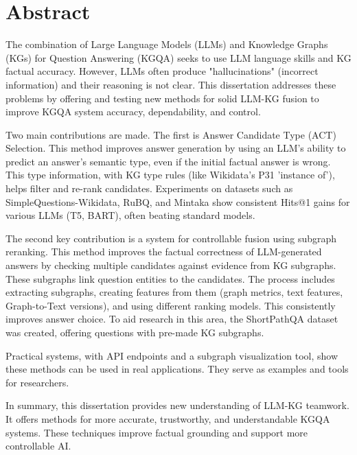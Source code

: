 \chapter*{Abstract}
The combination of Large Language Models (LLMs) and Knowledge Graphs (KGs) for Question Answering (KGQA) seeks to use LLM language skills and KG factual accuracy. However, LLMs often produce "hallucinations" (incorrect information) and their reasoning is not clear. This dissertation addresses these problems by offering and testing new methods for solid LLM-KG fusion to improve KGQA system accuracy, dependability, and control.

Two main contributions are made. The first is Answer Candidate Type (ACT) Selection. This method improves answer generation by using an LLM's ability to predict an answer's semantic type, even if the initial factual answer is wrong. This type information, with KG type rules (like Wikidata's P31 'instance of'), helps filter and re-rank candidates. Experiments on datasets such as SimpleQuestions-Wikidata, RuBQ, and Mintaka show consistent Hits@1 gains for various LLMs (T5, BART), often beating standard models.

The second key contribution is a system for controllable fusion using subgraph reranking. This method improves the factual correctness of LLM-generated answers by checking multiple candidates against evidence from KG subgraphs. These subgraphs link question entities to the candidates. The process includes extracting subgraphs, creating features from them (graph metrics, text features, Graph-to-Text versions), and using different ranking models. This consistently improves answer choice. To aid research in this area, the ShortPathQA dataset was created, offering questions with pre-made KG subgraphs.

Practical systems, with API endpoints and a subgraph visualization tool, show these methods can be used in real applications. They serve as examples and tools for researchers.

In summary, this dissertation provides new understanding of LLM-KG teamwork. It offers methods for more accurate, trustworthy, and understandable KGQA systems. These techniques improve factual grounding and support more controllable AI.